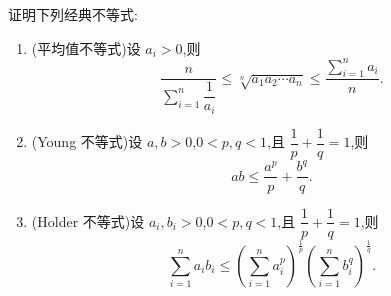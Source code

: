 \documentclass[../../数学分析培优讲义.tex]{subfiles}
\begin{document}
\begin{example}[\markstar]
证明下列经典不等式:
\begin{enumerate}[label=(\arabic*)]
    \item (平均值不等式)设 $a_i>0$,则
    \[
        \dfrac{n}{\displaystyle\sum\limits_{i=1}^n\dfrac{1}{a_i}}
        \leq\sqrt[n]{a_1a_2\cdots a_n}
        \leq\dfrac{\displaystyle\sum\limits_{i=1}^n a_i}{n}.
    \]
    \item (Young 不等式)设 $a,b>0$,$0<p,q<1$,且 $\dfrac{1}{p}+\dfrac{1}{q}=1$,则
    \[
        ab\leq\dfrac{a^p}{p}+\dfrac{b^q}{q}.
    \]
    \item (Holder 不等式)设 $a_i,b_i>0$,$0<p,q<1$,且 $\dfrac{1}{p}+\dfrac{1}{q}=1$,则
    \[
        \sum\limits_{i=1}^n a_i b_i
        \leq
        \left(\sum\limits_{i=1}^n a_i^p\right)^{\frac{1}{p}}
        \left(\sum\limits_{i=1}^n b_i^q\right)^{\frac{1}{q}}.
    \]
\end{enumerate}
\end{example}
\exampleblank
\end{document}
